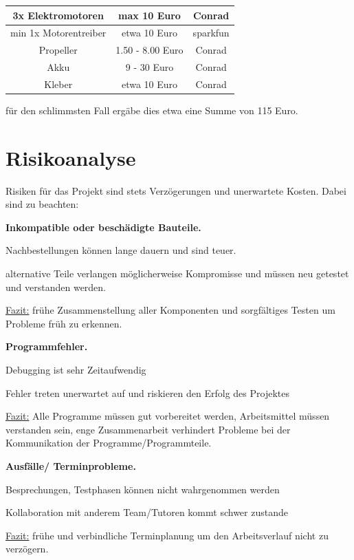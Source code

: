 \documentclass[lang=ngerman,inputenc=utf8,fontsize=10pt]{ldvarticle}
\begin{document}
\begin{tabular}{|c|c|c|}
\hline
3x Elektromotoren & max 10 Euro & Conrad \\
\hline
min 1x Motorentreiber & etwa 10 Euro & sparkfun \\
\hline
Propeller & 1.50 - 8.00 Euro & Conrad \\
\hline
Akku & 9 - 30 Euro & Conrad \\
\hline
Kleber & etwa 10 Euro & Conrad \\
\hline
\end{tabular}

für den schlimmsten Fall ergäbe dies etwa eine Summe von 115 Euro.




\section{Risikoanalyse}

Risiken für das Projekt sind stets Verzögerungen und unerwartete Kosten. Dabei sind zu beachten:

\textbf{Inkompatible oder beschädigte Bauteile.}
\begin{list}{->}{}
\item Nachbestellungen können lange dauern und sind teuer.
\item alternative Teile verlangen möglicherweise Kompromisse und müssen neu getestet und verstanden werden.
\end{list}
\underline{Fazit:} frühe Zusammenstellung aller Komponenten und sorgfältiges Testen um Probleme früh zu erkennen.


\textbf{Programmfehler.}
\begin{list}{->}{}
\item Debugging ist sehr Zeitaufwendig
\item Fehler treten unerwartet auf und riskieren den Erfolg des Projektes
\end{list}

\underline{Fazit:} Alle Programme müssen gut vorbereitet werden, Arbeitsmittel müssen verstanden sein, enge Zusammenarbeit verhindert Probleme bei der Kommunikation der Programme/Programmteile.


\textbf{Ausfälle/ Terminprobleme.}
\begin{list}{->}{}
\item Besprechungen, Testphasen können nicht wahrgenommen werden
\item Kollaboration mit anderem Team/Tutoren kommt schwer zustande
\end{list}
\underline{Fazit:} frühe und verbindliche Terminplanung um den Arbeitsverlauf nicht zu verzögern.
\end{document}
